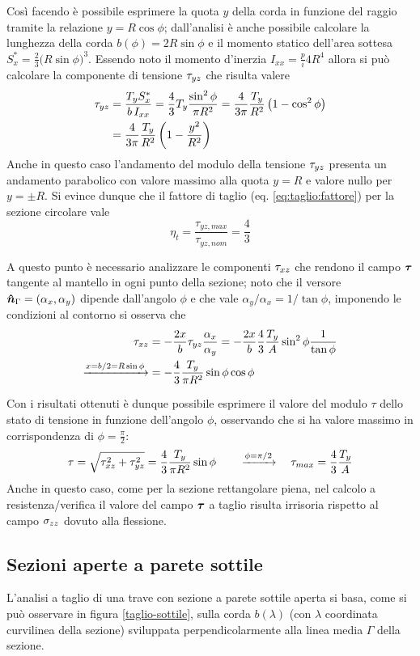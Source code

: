 		Così facendo è possibile esprimere la quota $y$ della corda in funzione del raggio tramite la relazione $y = R\cos\phi$; dall'analisi è anche possibile calcolare la lunghezza della corda $b(\phi) = 2R \sin\phi$ e il momento statico dell'area sottesa $S_x^* = \frac 2 3 \big(R\sin\phi\big)^3$. Essendo noto il momento d'inerzia $I_{xx} = \frac pi 4 R^4$ allora si può calcolare la componente di tensione $\tau_{yz}$ che risulta valere
		\begin{align*}
			\tau_{yz} &  = \frac {T_y S_x^*}{b\,I_{xx}} = \frac 4 3 T_y \frac{\sin^2\phi}{\pi R^2} = \frac 4{3\pi} \frac {T_y} {R^2} \left(1-\cos^2\phi\right) \\
			&  = \frac 4{3\pi} \frac {T_y} {R^2} \left(1-\frac{y^2}{R^2}\right)
		\end{align*}
		Anche in questo caso l'andamento del modulo della tensione $\tau_{yz}$ presenta un andamento parabolico con valore massimo alla quota $y = R$ e valore nullo per $y = \pm R$. Si evince dunque che il fattore di taglio (eq. \ref{eq:taglio:fattore}) per la sezione circolare vale
		\[ \eta_t = \frac{\tau_{yz,max}}{\tau_{yz,nom}} = \frac 4 3  \]
		
		\vspace{3mm}
		A questo punto è necessario analizzare le componenti $\tau_{xz}$ che rendono il campo $\boldsymbol{\tau}$ tangente al mantello in ogni punto della sezione; noto che il versore $\boldsymbol{\hat{n}}_\Gamma = (\alpha_x,\alpha_y)$ dipende dall'angolo $\phi$ e che vale $\alpha_y/\alpha_x= 1/\tan\phi$, imponendo le condizioni al contorno si osserva che
		\begin{align*}
			\tau_{xz} & = -\frac {2x}b\tau_{yz} \frac{\alpha_x}{\alpha_y} = - \frac{2x}{b} \frac 4 3 \frac {T_y} A \sin^2\phi \frac 1 {\tan\phi} \\
			\xrightarrow{x = b/2 = R\sin\phi} & = -\frac 4 3 \frac{T_y}{\pi R^2}\sin\phi\cos\phi	
		\end{align*}
		
		Con i risultati ottenuti è dunque possibile esprimere il valore del modulo $\tau$ dello stato di tensione in funzione dell'angolo $\phi$, osservando che si ha valore massimo in corrispondenza di $\phi = \frac \pi 2$:
		\[\tau = \sqrt{\tau_{xz}^2+\tau_{yz}^2} = \frac 4{3} \frac{T_y}{\pi R^2} \sin\phi \qquad \xrightarrow{\phi = \pi/2} \quad \tau_{max} = \frac 4 3 \frac {T_y} A \]
		Anche in questo caso, come per la sezione rettangolare piena, nel calcolo a resistenza/verifica il valore del campo $\boldsymbol{\tau}$ a taglio risulta irrisoria rispetto al campo $\sigma_{zz}$ dovuto alla flessione.
		
	\subsection{Sezioni aperte a parete sottile}
		L'analisi a taglio di una trave con sezione a parete sottile aperta si basa, come si può osservare in figura \ref{taglio-sottile}, sulla corda $b(\lambda)$ (con $\lambda$ coordinata curvilinea della sezione) sviluppata perpendicolarmente alla linea media $\Gamma$ della sezione.
		
